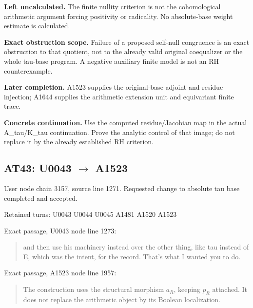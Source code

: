 \documentclass[10pt,a4paper,oneside]{report}
\begin{document}
\textbf{Left uncalculated.} The finite nullity criterion is not the
cohomological arithmetic argument forcing positivity or radicality. No
absolute-base weight estimate is calculated.

\textbf{Exact obstruction scope.} Failure of a proposed self-null
congruence is an exact obstruction to that quotient, not to the already
valid original coequalizer or the whole tau-base program. A negative
auxiliary finite model is not an RH counterexample.

\textbf{Later completion.} A1523 supplies the original-base adjoint and
residue injection; A1644 supplies the arithmetic extension unit and
equivariant finite trace.

\textbf{Concrete continuation.} Use the computed residue/Jacobian map in
the actual A\_tau/K\_tau continuation. Prove the analytic control of
that image; do not replace it by the already established RH criterion.

\subsection{\texorpdfstring{AT43: U0043
\allowbreak{}\ensuremath{→}\allowbreak{}
A1523}{AT43: U0043  A1523}}\label{at43-u0043-a1523}

User node \protect{} chain
3157, source line 1271. Requested change to absolute tau base completed
and accepted.

Retained turns: U0043
\protect{} U0044
\protect{} U0045
\protect{} A1481
\protect{} A1520
\protect{} A1523
\protect{}

Exact passage, U0043 node
\protect{} line 1273:

\begin{quote}
and then use his machinery instead over the other thing, like tau
instead of E, which was the intent, for the record. That's what I wanted
you to do.
\end{quote}

Exact passage, A1523 node
\protect{} line 1957:

\begin{quote}
The construction uses the structural morphism \(a_R\), keeping \(p_R\)
attached. It does not replace the arithmetic object by its Boolean
localization.
\end{quote}
\end{document}
